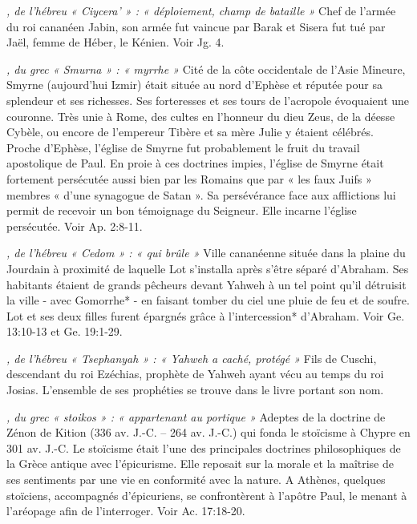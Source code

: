 \begin{multicols}{2}
\textit{, de l'hébreu « Ciycera' » : « déploiement, champ de bataille »}\newline
Chef de l'armée du roi cananéen Jabin, son armée fut vaincue par Barak et Sisera fut tué par Jaël, femme de Héber, le Kénien. Voir Jg. 4.

\textit{, du grec « Smurna » : « myrrhe »}\newline
Cité de la côte occidentale de l'Asie Mineure, Smyrne (aujourd'hui Izmir) était située au nord d'Ephèse et réputée pour sa splendeur et ses richesses. Ses forteresses et ses tours de l'acropole évoquaient une couronne. Très unie à Rome, des cultes en l'honneur du dieu Zeus, de la déesse Cybèle, ou encore de l'empereur Tibère et sa mère Julie y étaient célébrés. Proche d'Ephèse, l'église de Smyrne fut probablement le fruit du travail apostolique de Paul. En proie à ces doctrines impies, l'église de Smyrne était fortement persécutée aussi bien par les Romains que par « les faux Juifs » membres « d'une synagogue de Satan ». Sa persévérance face aux afflictions lui permit de recevoir un bon témoignage du Seigneur. Elle incarne l'église persécutée. Voir Ap. 2:8-11.

\textit{, de l'hébreu « Cedom » : « qui brûle »}\newline
Ville cananéenne située dans la plaine du Jourdain à proximité de laquelle Lot s'installa après s'être séparé d'Abraham. Ses habitants étaient de grands pêcheurs devant Yahweh à un tel point qu'il détruisit la ville - avec Gomorrhe* - en faisant tomber du ciel une pluie de feu et de soufre. Lot et ses deux filles furent épargnés grâce à l'intercession* d'Abraham. Voir Ge. 13:10-13 et Ge. 19:1-29.

\textit{, de l'hébreu « Tsephanyah » : « Yahweh a caché, protégé »}\newline
Fils de Cuschi, descendant du roi Ezéchias, prophète de Yahweh ayant vécu au temps du roi Josias. L'ensemble de ses prophéties se trouve dans le livre portant son nom.

\textit{, du grec « stoikos » : « appartenant au portique »}\newline
Adeptes de la doctrine de Zénon de Kition (336 av. J.-C. – 264 av. J.-C.) qui fonda le stoïcisme à Chypre en 301 av. J.-C. Le stoïcisme était l'une des principales doctrines philosophiques de la Grèce antique avec l'épicurisme. Elle reposait sur la morale et la maîtrise de ses sentiments par une vie en conformité avec la nature. A Athènes, quelques stoïciens, accompagnés d'épicuriens, se confrontèrent à l'apôtre Paul, le menant à l'aréopage afin de l'interroger. Voir Ac. 17:18-20.


\end{multicols}
